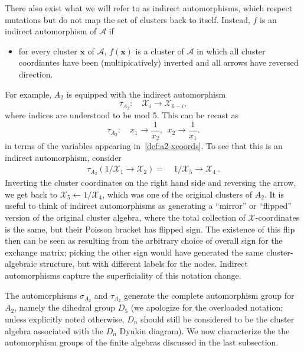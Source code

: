 \documentclass[11pt]{article}
\def\x{\mathcal{X}}
\def\a{\mathcal{A}}
\begin{document}
There also exist what we will refer to as indirect automorphisms, which respect mutations but do not map the set of clusters back to itself. Instead, $f$ is an indirect automorphism of $\a$ if
\begin{itemize}
  \item for every cluster $\mathbf{x}$ of $\a$, $f(\mathbf{x})$ is a cluster of $\a$ in which all cluster coordiantes have been (multipicatively) inverted and all arrows have reversed direction.
\end{itemize}
For example, $A_2$ is equipped with the indirect automorphism
\begin{equation}
  \tau_{A_2}:\quad \mathcal{X}_i \to \mathcal{X}_{6-i},
\end{equation}
where indices are understood to be mod 5. This can be recast as
\begin{equation}
  \tau_{A_2}:\quad x_1 \to \frac{1}{x_2}, ~~x_2 \to \frac{1}{x_1}.
\end{equation}
in terms of the variables appearing in~\eqref{def:a2-xcoords}. To see that this is an indirect automorphism, consider
\begin{align}
  \tau_{A_2}(1/\x_1 \to \x_2) =&~1/\x_5 \to \x_4 \ .
\end{align}
Inverting the cluster coordinates on the right hand side and reversing the arrow, we get back to $\x_5 \leftarrow 1/\x_4$, which was one of the original clusters of $A_2$. It is useful to think of indirect automorphisms as generating a ``mirror'' or ``flipped'' version of the original cluster algebra, where the total collection of $\x$-coordinates is the same, but their Poisson bracket has flipped sign. The existence of this flip then can be seen as resulting from the arbitrary choice of overall sign for the exchange matrix; picking the other sign would have generated the same cluster-algebraic structure, but with different labels for the nodes. Indirect automorphisms capture the superficiality of this notation change.

The automorphisms $\sigma_{A_2}$ and $\tau_{A_2}$ generate the complete automorphism group for $A_2$, namely the dihedral group $D_5$ (we apologize for the overloaded notation; unless explicitly noted otherwise, $D_n$ should still be considered to be the cluster algebra associated with the $D_n$ Dynkin diagram). We now characterize the the automorphism groups of the finite algebras discussed in the last subsection. 
\end{document}
